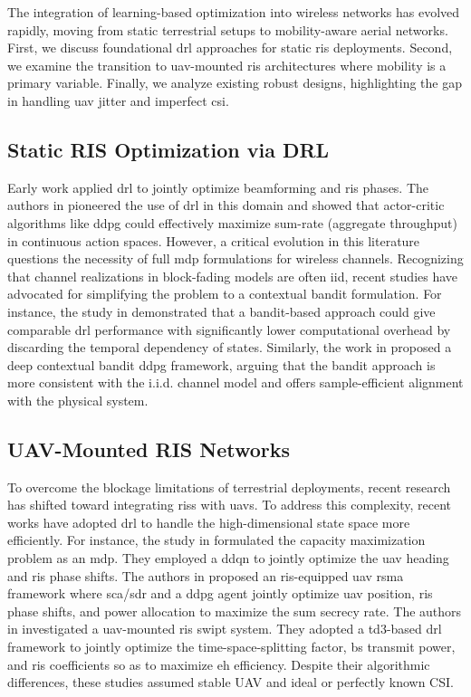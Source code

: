 The integration of learning-based optimization into wireless networks has evolved rapidly, moving from static terrestrial setups to mobility-aware aerial networks. First, we discuss foundational \gls{drl} approaches for static \gls{ris} deployments. Second, we examine the transition to \gls{uav}-mounted \gls{ris} architectures where mobility is a primary variable. Finally, we analyze existing robust designs, highlighting the gap in handling \gls{uav} jitter and imperfect \gls{csi}.

\subsection{Static RIS Optimization via DRL}

Early work applied \gls{drl} to jointly optimize beamforming and \gls{ris} phases. The authors in \cite{9110869} pioneered the use of \gls{drl} in this domain and showed that actor-critic algorithms like \gls{ddpg} could effectively maximize sum-rate (aggregate throughput) in continuous action spaces. However, a critical evolution in this literature questions the necessity of full \gls{mdp} formulations for wireless channels. Recognizing that channel realizations in block-fading models are often \gls{iid}, recent studies have advocated for simplifying the problem to a contextual bandit formulation. For instance, the study in \cite{9838369} demonstrated that a bandit-based approach could give comparable \gls{drl} performance with significantly lower computational overhead by discarding the temporal dependency of states. Similarly, the work in \cite{10054092} proposed a deep contextual bandit \gls{ddpg} framework, arguing that the bandit approach is more consistent with the i.i.d. channel model and offers sample-efficient alignment with the physical system.

\subsection{UAV-Mounted RIS Networks}
To overcome the blockage limitations of terrestrial deployments, recent research has shifted toward integrating \glspl{ris} with \glspl{uav}. To address this complexity, recent works have adopted \gls{drl} to handle the high-dimensional state space more efficiently. For instance, the study in \cite{9919620} formulated the capacity maximization problem as an \gls{mdp}. They employed a \gls{ddqn} to jointly optimize the \gls{uav} heading and \gls{ris} phase shifts. The authors in \cite{10817512} proposed an \gls{ris}-equipped \gls{uav} \gls{rsma} framework where \gls{sca}/\gls{sdr} and a \gls{ddpg} agent jointly optimize \gls{uav} position, \gls{ris} phase shifts, and power allocation to maximize the sum secrecy rate. The authors in \cite{10812045} investigated a \gls{uav}-mounted \gls{ris} \gls{swipt} system. They adopted a \gls{td3}-based \gls{drl} framework to jointly optimize the time-space-splitting factor, \gls{bs} transmit power, and \gls{ris} coefficients so as to maximize \gls{eh} efficiency. Despite their algorithmic differences, these studies assumed stable UAV and ideal or perfectly known CSI.


